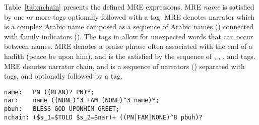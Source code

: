 Table~\ref{tab:nchain} presents the defined MRE expressions. 
MRE {\em name} is satisfied by one or more  tags optionally followed 
with a  tag. 
MRE  denotes narrator which is a complex Arabic name
composed as a sequence of Arabic names () 
connected with family indicators (). 
The  tags in  allow for unexpected words 
that can occur between names. 
MRE  denotes a praise phrase often associated with 
the end of a hadith (peace be upon him), 
and is the satisfied by the sequence of
, , , and  tags. 
MRE  denotes narrator chain, 
and is a sequence of narrators ()
separated with  tags, and optionally followed
by a  tag. 

\setarab
\begin{table}[tb!]
  \centering
  \caption{Narrator chain example.}
\begin{Verbatim}[fontsize=\relsize{-1},commandchars=\\\{\},codes={\catcode`$=3 \catcode`_=8}]
name:   PN ((MEAN)? PN)*;
nar:    name ((NONE)^3 FAM (NONE)^3 name)*;
pbuh:   BLESS GOD UPONHIM GREET;
nchain: ($s_1=$TOLD $s_2=$nar)+ ((PN|FAM|NONE)^8 pbuh)?
\end{Verbatim}
  \label{tab:nchain}%
  \vspace{-3em}
\end{table}%

